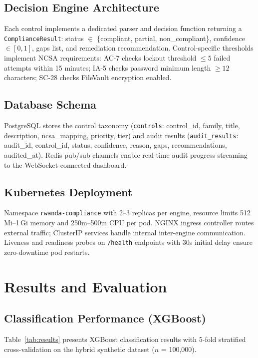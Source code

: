 \documentclass[futureinternet,article,submit,pdftex,moreauthors]{Definitions/mdpi}
\begin{document}
\subsection{Decision Engine Architecture}

Each control implements a dedicated parser and decision function returning a
\texttt{ComplianceResult}: status $\in$ \{compliant, partial, non\_compliant\},
confidence $\in [0,1]$, gaps list, and remediation recommendation. Control-specific thresholds
implement NCSA requirements: AC-7 checks lockout threshold $\leq 5$ failed attempts within
15 minutes; IA-5 checks password minimum length $\geq 12$ characters; SC-28 checks FileVault
encryption enabled.

\subsection{Database Schema}

PostgreSQL stores the control taxonomy (\texttt{controls}: control\_id, family, title,
description, ncsa\_mapping, priority, tier) and audit results (\texttt{audit\_results}:
audit\_id, control\_id, status, confidence, reason, gaps, recommendations, audited\_at).
Redis pub/sub channels enable real-time audit progress streaming to the WebSocket-connected
dashboard.

\subsection{Kubernetes Deployment}

Namespace \texttt{rwanda-compliance} with 2--3 replicas per engine, resource limits
512\,Mi--1\,Gi memory and 250m--500m CPU per pod. NGINX ingress controller routes external
traffic; ClusterIP services handle internal inter-engine communication. Liveness and readiness
probes on \texttt{/health} endpoints with 30s initial delay ensure zero-downtime pod restarts.

\section{Results and Evaluation}
\label{sec:results}

\subsection{Classification Performance (XGBoost)}

Table~\ref{tab:results} presents XGBoost classification results with 5-fold stratified
cross-validation on the hybrid synthetic dataset ($n$ = 100{,}000).
\end{document}
